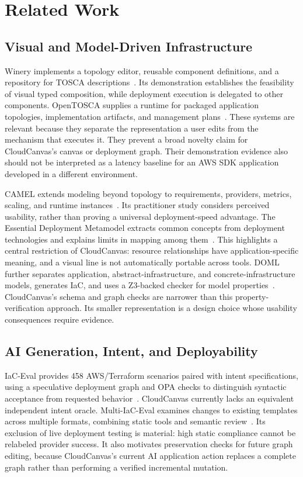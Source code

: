 \section{Related Work}
\subsection{Visual and Model-Driven Infrastructure}
Winery implements a topology editor, reusable component definitions, and a repository for TOSCA descriptions~\cite{winery2013}. Its demonstration establishes the feasibility of visual typed composition, while deployment execution is delegated to other components. OpenTOSCA supplies a runtime for packaged application topologies, implementation artifacts, and management plans~\cite{opentosca2013}. These systems are relevant because they separate the representation a user edits from the mechanism that executes it. They prevent a broad novelty claim for CloudCanvas's canvas or deployment graph. Their demonstration evidence also should not be interpreted as a latency baseline for an AWS SDK application developed in a different environment.

CAMEL extends modeling beyond topology to requirements, providers, metrics, scaling, and runtime instances~\cite{camel2019}. Its practitioner study considers perceived usability, rather than proving a universal deployment-speed advantage. The Essential Deployment Metamodel extracts common concepts from deployment technologies and explains limits in mapping among them~\cite{edmm2020}. This highlights a central restriction of CloudCanvas: resource relationships have application-specific meaning, and a visual line is not automatically portable across tools. DOML further separates application, abstract-infrastructure, and concrete-infrastructure models, generates IaC, and uses a Z3-backed checker for model properties~\cite{doml2024}. CloudCanvas's schema and graph checks are narrower than this property-verification approach. Its smaller representation is a design choice whose usability consequences require evidence.

\subsection{AI Generation, Intent, and Deployability}
IaC-Eval provides 458 AWS/Terraform scenarios paired with intent specifications, using a speculative deployment graph and OPA checks to distinguish syntactic acceptance from requested behavior~\cite{iaceval2024}. CloudCanvas currently lacks an equivalent independent intent oracle. Multi-IaC-Eval examines changes to existing templates across multiple formats, combining static tools and semantic review~\cite{multi2025}. Its exclusion of live deployment testing is material: high static compliance cannot be relabeled provider success. It also motivates preservation checks for future graph editing, because CloudCanvas's current AI application action replaces a complete graph rather than performing a verified incremental mutation.

